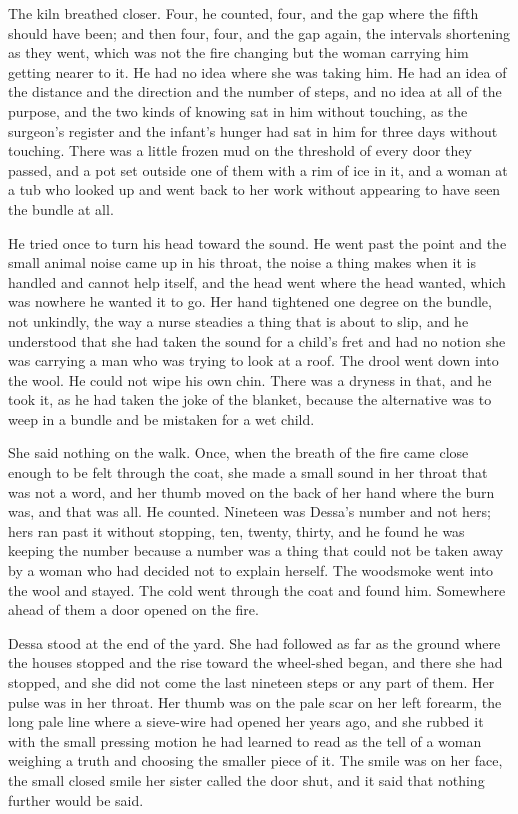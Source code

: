 The kiln breathed closer. Four, he counted, four, and the gap where the fifth should have been; and then four, four, and the gap again, the intervals shortening as they went, which was not the fire changing but the woman carrying him getting nearer to it. He had no idea where she was taking him. He had an idea of the distance and the direction and the number of steps, and no idea at all of the purpose, and the two kinds of knowing sat in him without touching, as the surgeon's register and the infant's hunger had sat in him for three days without touching. There was a little frozen mud on the threshold of every door they passed, and a pot set outside one of them with a rim of ice in it, and a woman at a tub who looked up and went back to her work without appearing to have seen the bundle at all.

He tried once to turn his head toward the sound. He went past the point and the small animal noise came up in his throat, the noise a thing makes when it is handled and cannot help itself, and the head went where the head wanted, which was nowhere he wanted it to go. Her hand tightened one degree on the bundle, not unkindly, the way a nurse steadies a thing that is about to slip, and he understood that she had taken the sound for a child's fret and had no notion she was carrying a man who was trying to look at a roof. The drool went down into the wool. He could not wipe his own chin. There was a dryness in that, and he took it, as he had taken the joke of the blanket, because the alternative was to weep in a bundle and be mistaken for a wet child.

She said nothing on the walk. Once, when the breath of the fire came close enough to be felt through the coat, she made a small sound in her throat that was not a word, and her thumb moved on the back of her hand where the burn was, and that was all. He counted. Nineteen was Dessa's number and not hers; hers ran past it without stopping, ten, twenty, thirty, and he found he was keeping the number because a number was a thing that could not be taken away by a woman who had decided not to explain herself. The woodsmoke went into the wool and stayed. The cold went through the coat and found him. Somewhere ahead of them a door opened on the fire.

\scenebreak

Dessa stood at the end of the yard. She had followed as far as the ground where the houses stopped and the rise toward the wheel-shed began, and there she had stopped, and she did not come the last nineteen steps or any part of them. Her pulse was in her throat. Her thumb was on the pale scar on her left forearm, the long pale line where a sieve-wire had opened her years ago, and she rubbed it with the small pressing motion he had learned to read as the tell of a woman weighing a truth and choosing the smaller piece of it. The smile was on her face, the small closed smile her sister called the door shut, and it said that nothing further would be said.

